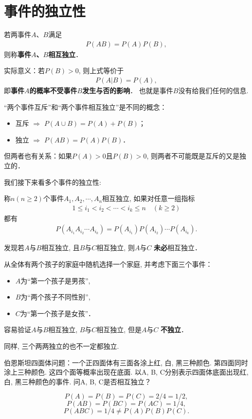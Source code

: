 \section{事件的独立性}

\begin{definition}
    若两事件$A$、$B$满足
    \begin{align*}
        P(AB)= P(A) P(B),
    \end{align*}
    则称\textbf{事件$A$、$B$相互独立}．%
\end{definition}

实际意义：若$P(B)>0$, 则上式等价于
\begin{align*}
    P(A|B)= P(A),
\end{align*}
即\textbf{事件$A$的概率不受事件$B$发生与否的影响}． 也就是事件$B$没有给我们任何的信息.

\begin{remark}
    “两个事件互斥”和“两个事件相互独立”是不同的概念：
    \begin{itemize}
        \item 互斥 $\Rightarrow$ $P(A\cup B)=P(A)+P(B)$；
        \item 独立 $\Rightarrow$ $P(AB)=P(A)P(B)$．
    \end{itemize}
    但两者也有关系：如果$P(A)>0$且$P(B)>0$, 则两者不可能既是互斥的又是独立的．
\end{remark}

我们接下来看多个事件的独立性:

\begin{definition}
    称$n(n\ge 2)$个事件$A_1, A_2, \cdots, A_n$相互独立, 如果对任意一组指标
    \begin{align*}
        1\le i_1<i_2< \cdots <i_k\le n\quad (k\ge 2)
    \end{align*}
    都有
    \begin{align*}
        P(A_{i_1}A_{i_2}\cdots A_{i_k})=P(A_{i_1})P(A_{i_2})\cdots  P(A_{i_k}).
    \end{align*}
\end{definition}

发现若$A$与$B$相互独立, 且$B$与$C$相互独立, 则$A$与$C$ \textbf{未必}相互独立．
\begin{example}
    从全体有两个孩子的家庭中随机选择一个家庭, 并考虑下面三个事件：
    \begin{itemize}
        \item $A$为“第一个孩子是男孩”, 
        \item $B$为“两个孩子不同性别”, 
        \item $C$为“第一个孩子是女孩”．
    \end{itemize}
    容易验证$A$与$B$相互独立, $B$与$C$相互独立, 但是$A$与$C$ \textbf{不独立}．

    同样, 三个两两独立的也不一定都独立.

    伯恩斯坦四面体问题：一个正四面体有三面各涂上红, 白, 黑三种颜色. 第四面同时涂上三种颜色. 这四个面等概率出现在底面. 以A, B, C分别表示四面体底面出现红, 白, 黑三种颜色的事件. 问A, B, C是否相互独立？

    $$
        P(A)=P(B)=P(C)=2/4=1/2,
    $$
    $$
        P(AB)=P(BC)=P(AC)=1/4,
    $$
    $$
        P(ABC)=1/4\neq P(A)P(B)P(C).
    $$
\end{example}


